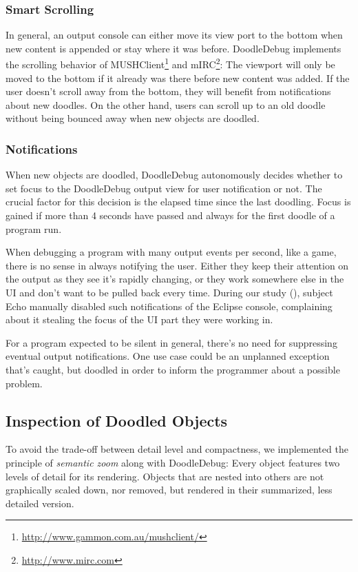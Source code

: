 \documentclass[english]{scrartcl}
\newcommand{\DD}{Dood\-le\-De\-bug\xspace}
\begin{document}
\subsubsection{Smart Scrolling}
In general, an output console can either move its view port to the bottom when new content is appended or stay where it was before.
\DD implements the scrolling behavior of MUSHClient\footnote{\url{http://www.gammon.com.au/mushclient/}} and mIRC\footnote{\url{http://www.mirc.com}}:
The viewport will only be moved to the bottom if it already was there before new content was added.
If the user doesn't scroll away from the bottom, they will benefit from notifications about new doodles.
On the other hand, users can scroll up to an old doodle without being bounced away when new objects are doodled.

\subsubsection{Notifications}
When new objects are doodled, \DD autonomously decides whether to set focus to the \DD output view for user notification or not.
The crucial factor for this decision is the elapsed time since the last doodling.
Focus is gained if more than 4 seconds have passed and always for the first doodle of a program run.

When debugging a program with many output events per second, like a game, there is no sense in always notifying the user.
Either they keep their attention on the output as they see it's rapidly changing, or they work somewhere else in the UI and don't want to be pulled back every time.
During our study (), subject Echo manually disabled such notifications of the Eclipse console, complaining about it stealing the focus of the UI part they were working in.

For a program expected to be silent in general, there's no need for suppressing eventual output notifications.
One use case could be an unplanned exception that's caught, but doodled in order to inform the programmer about a possible problem.


\subsection{Inspection of Doodled Objects}
To avoid the trade-off between detail level and compactness, we implemented the principle of \emph{semantic zoom} along with \DD:
Every object features two levels of detail for its rendering.
Objects that are nested into others are not graphically scaled down, nor removed, but rendered in their summarized, less detailed  version.
\end{document}
